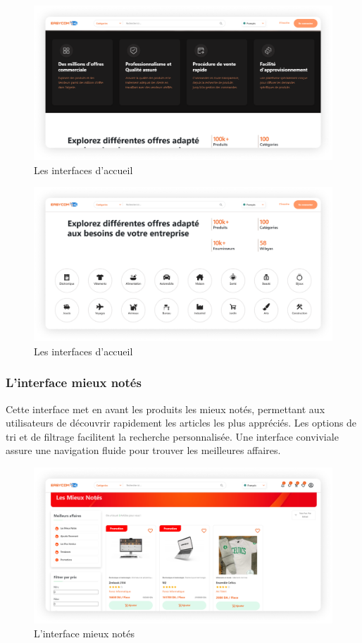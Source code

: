 \documentclass[edit,12pt,a4paper,ChapStyle,oneside,doubleinterligne]{report}
\begin{document}
\begin{figure} [H]
    \centering
    \includegraphics[width=1\textwidth]{images/home 2.png}
    \caption{Les interfaces d'accueil}
    \label{fig:colors}
\end{figure}
\begin{figure} [H]
    \centering
    \includegraphics[width=1\textwidth]{images/home 3.png}
    \caption{Les interfaces d'accueil}
    \label{fig:colors}
\end{figure}
\subsubsection{L'interface mieux notés}
Cette interface met en avant les produits les mieux notés, permettant aux utilisateurs de découvrir rapidement les articles les plus appréciés. Les options de tri et de filtrage facilitent la recherche personnalisée. Une interface conviviale assure une navigation fluide pour trouver les meilleures affaires.
  \begin{figure} [H]
    \centering
    \includegraphics[width=1\textwidth]{images/afficher les annonce 1.png}
    \caption{L'interface mieux notés}
    \label{fig:mieux notés}
\end{figure}
\end{document}
